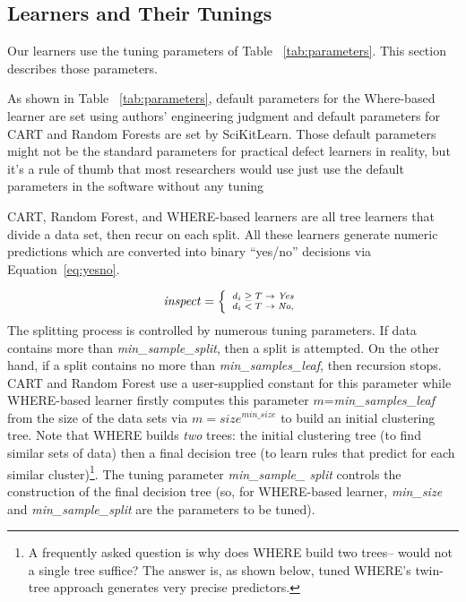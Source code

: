 \documentclass{sig-alternative}
\newcommand{\tab}[1]{Table ~\ref{tab:#1}}
\newcommand{\eq}[1]{Equation~\ref{eq:#1}}
\begin{document}
\subsection{Learners and Their Tunings}


Our learners use the tuning parameters of \tab{parameters}. This section describes those parameters.

As shown in \tab{parameters}, default parameters for the Where-based learner are set using authors' engineering judgment and default parameters for CART and Random Forests are set by SciKitLearn. Those default parameters might not be the standard parameters for practical defect learners in reality, but it's a rule of thumb that most researchers would use just use the default parameters in the software without any tuning


CART, Random Forest, and WHERE-based learners are all  tree learners that divide a data set, then recur
on each split.
All these learners
generate numeric predictions which are converted
into binary ``yes/no'' decisions via \eq{yesno}.

\begin{equation}\label{eq:yesno}\scriptsize
\mathit{inspect}= \left\{
\begin{array}{ll}
d_i \ge T \rightarrow \mathit{Yes}\\
d_i <   T \rightarrow \mathit{No} ,
\end{array}\right.
\end{equation}
The splitting process is controlled by numerous tuning parameters.
If data contains more than {\em min\_sample\_split}, then a split is attempted.
On the other hand, if a split contains no more than {\em min\_samples\_leaf}, then recursion stops. CART and Random Forest use a 
user-supplied constant for this parameter while
WHERE-based learner firstly computes this parameter $m$={\em min\_samples\_leaf} from the size of the data
sets via  $m=\mathit{size}^\mathit{min\_size}$ to build an initial  clustering tree.
Note that WHERE builds {\em two} trees: the initial clustering tree (to find similar sets of data)
then a final decision tree (to learn rules that predict for each similar cluster)\footnote{A
frequently asked question is why does WHERE build two trees--
would not   a single tree suffice? The answer is, as shown below,  tuned WHERE's twin-tree approach 
generates very precise predictors.}.
The tuning parameter  {\em min\_sample\_ split } controls the construction of the
final decision tree (so, for WHERE-based learner,
{\em min\_size} and {\em min\_sample\_split} are the parameters to be tuned).
\end{document}
